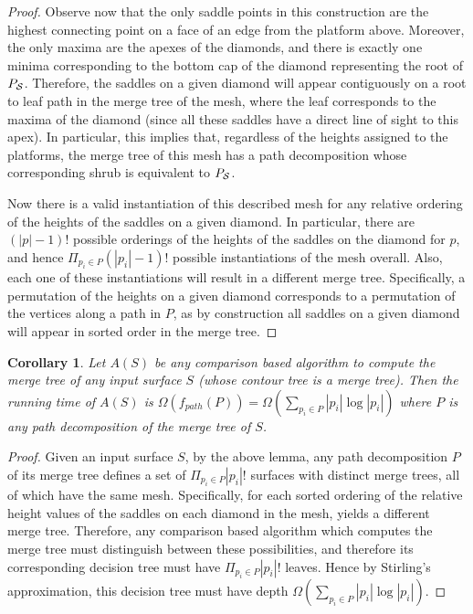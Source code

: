 \documentclass[11pt]{article}
\newtheorem{corollary}[theorem]{Corollary}
\theoremstyle{definition}
\begin{document}
\begin{proof}
 Observe now that the only saddle points in this construction are the highest connecting point on a face of an edge from the platform above.  Moreover, the only maxima are the apexes of the 
 diamonds, and there is exactly one minima corresponding to the bottom cap of the diamond representing the root of $P_{\mathcal{S}}$.  Therefore, the saddles on a given 
 diamond will appear contiguously on a root to leaf path in the merge tree of the mesh, where the leaf corresponds to the maxima of the diamond 
 (since all these saddles have a direct line of sight to this apex).  In particular, 
 this implies that, regardless of the heights assigned to the platforms, the merge tree of this mesh has a path decomposition whose corresponding shrub is equivalent to $P_{\mathcal{S}}$.  
 
 Now there is a valid instantiation of this described mesh for any relative ordering of the heights of the saddles on a given diamond.  In particular, 
 there are $(|p|-1)!$ possible orderings of the heights of the saddles on the diamond for $p$, and hence $\Pi_{p_i\in P} (|p_i|-1)!$ possible instantiations of 
 the mesh overall.  Also, each one of these instantiations will result in a different merge tree.  Specifically, a permutation of the heights on a given diamond 
 corresponds to a permutation of the vertices along a path in $P$, as by construction all saddles on a given diamond will appear in sorted order in the merge tree.
\end{proof}



\begin{corollary}
 \label{cor:mergeLB}
 Let $A(S)$ be any comparison based algorithm to compute the merge tree of any input surface $S$ (whose contour tree is a merge tree).  
 Then the running time of $A(S)$ is $\Omega(f_{path}(P))=\Omega(\sum_{p_i\in P} |p_i|\log|p_i|)$ where $P$ is any path decomposition of the 
 merge tree of $S$.
\end{corollary}
\begin{proof}
 Given an input surface $S$, by the above lemma, any path decomposition $P$ of its merge tree defines a set of $\Pi_{p_i\in P} |p_i|!$ surfaces 
 with distinct merge trees, all of which have the same mesh.  Specifically, for each sorted ordering of the relative height values of the saddles 
 on each diamond in the mesh, yields a different merge tree.
 Therefore, any comparison based algorithm which computes the merge tree must distinguish between these possibilities, and therefore its corresponding decision tree must 
 have $\Pi_{p_i\in P} |p_i|!$ leaves.  Hence by Stirling's approximation, this decision tree must have depth $\Omega(\sum_{p_i\in P} |p_i|\log|p_i|)$.
\end{proof}
\end{document}
